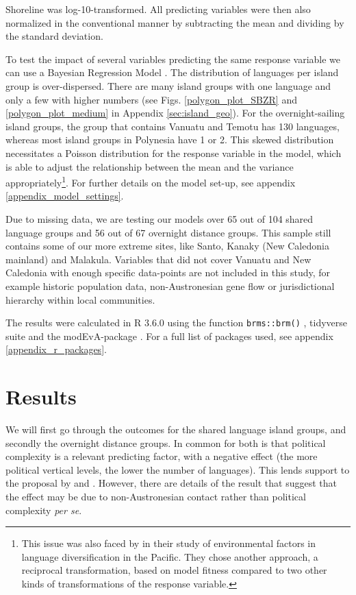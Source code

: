 \documentclass[12pt,letterpaper]{article}
\begin{document}
Shoreline was log-10-transformed. All predicting variables were then also normalized in the conventional manner by subtracting the mean and dividing by the standard deviation.

To test the impact of several variables predicting the same response variable we can use a Bayesian Regression Model \citep{gelman2006data, burkner2017brms}. The distribution of languages per island group is over-dispersed. There are many island groups with one language and only a few with higher numbers (see Figs. \ref{polygon_plot_SBZR} and \ref{polygon_plot_medium} in Appendix \ref{sec:island_geo}). For the overnight-sailing island groups, the group that contains Vanuatu and Temotu has 130 languages, whereas most island groups in Polynesia have 1 or 2. This skewed distribution necessitates a Poisson distribution for the response variable in the model, which is able to adjust the relationship between the mean and the variance appropriately\footnote{This issue was also faced by \citet{gavin2012island} in their study of environmental factors in language diversification in the Pacific. They chose another approach, a reciprocal transformation, based on model fitness compared to two other kinds of transformations of the response variable.}. For further details on the model set-up, see appendix \ref{appendix_model_settings}.

Due to missing data, we are testing our models over 65 out of 104 shared language groups and 56 out of 67 overnight distance groups. This sample still contains some of our more extreme sites, like Santo, Kanaky (New Caledonia mainland) and Malakula. Variables that did not cover Vanuatu and New Caledonia with enough specific data-points are not included in this study, for example historic population data, non-Austronesian gene flow or jurisdictional hierarchy within local communities. 

The results were calculated in R 3.6.0 \citep{R} using the function \texttt{brms::brm()} \citep{burkner2017brms}, tidyverse suite \citep{tidyverse13} and the modEvA-package \citep{barbosa2016package}. For a full list of packages used, see appendix \ref{appendix_r_packages}.

\FloatBarrier
\section{Results}
We will first go through the outcomes for the shared language island groups, and secondly the overnight distance groups. In common for both is that political complexity is a relevant predicting factor, with a negative effect (the more political vertical levels, the lower the number of languages). This lends support to the proposal by \citet{pawley81} and \citet{pawley2007}. However, there are details of the result that suggest that the effect may be due to non-Austronesian contact rather than political complexity \emph{per se}.
\end{document}
